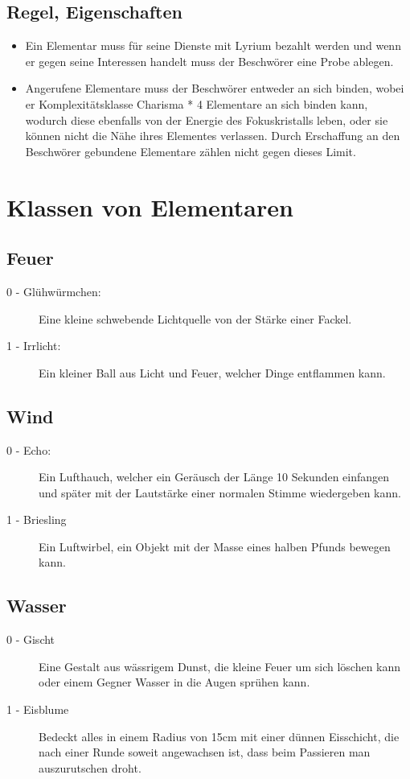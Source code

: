 \documentclass[a4paper,12pt,oneside]{book}
\begin{document}
\subsection{Regel, Eigenschaften}
\begin{itemize}
\item Ein Elementar muss für seine Dienste mit Lyrium bezahlt werden und wenn er gegen seine Interessen handelt muss der Beschwörer eine Probe ablegen.
\item Angerufene Elementare muss der Beschwörer entweder an sich binden, wobei er Komplexitätsklasse Charisma * 4 Elementare an sich binden kann, wodurch diese ebenfalls von der Energie des Fokuskristalls leben, oder sie können nicht die Nähe ihres Elementes verlassen. Durch Erschaffung an den Beschwörer gebundene Elementare zählen nicht gegen dieses Limit. 
\end{itemize}
\section{Klassen von Elementaren}
\subsection{Feuer}
\begin{description}
\item[0 - Glühwürmchen:]Eine kleine schwebende Lichtquelle von der Stärke einer Fackel.
\item[1 - Irrlicht:]Ein kleiner Ball aus Licht und Feuer, welcher Dinge entflammen kann.
\end{description}
\subsection{Wind}
\begin{description}
\item[0 - Echo:]Ein Lufthauch, welcher ein Geräusch der Länge 10 Sekunden einfangen und später mit der Lautstärke einer normalen Stimme wiedergeben kann.
\item[1 - Briesling]Ein Luftwirbel, ein Objekt mit der Masse eines halben Pfunds bewegen kann.
\end{description}
\subsection{Wasser}
\begin{description} 
\item[0 - Gischt]Eine Gestalt aus wässrigem Dunst, die kleine Feuer um sich löschen kann oder einem Gegner Wasser in die Augen sprühen kann.
\item[1 - Eisblume]Bedeckt alles in einem Radius von 15cm mit einer dünnen Eisschicht, die nach einer Runde soweit angewachsen ist, dass beim Passieren man auszurutschen droht.
\end{description}
\end{document}
